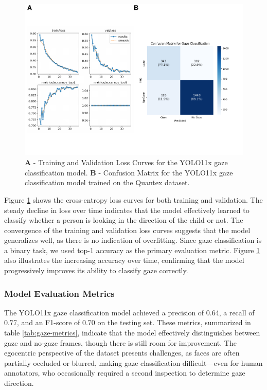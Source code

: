 \documentclass[
  man,floatsintext]{apa6}
\begin{document}
\begin{figure}

{\centering \includegraphics{Quantex_interaction_paper_files/figure-latex/gaze-loss-confusion-matrix-1} 

}

\caption{\textbf{A} - Training and Validation Loss Curves for the YOLO11x gaze classification model. \textbf{B} - Confusion Matrix for the YOLO11x gaze classification model trained on the Quantex dataset.}\label{fig:gaze-loss-confusion-matrix}
\end{figure}

Figure \ref{fig:gaze-loss-confusion-matrix} shows the cross-entropy loss curves for both training and validation. The steady decline in loss over time indicates that the model effectively learned to classify whether a person is looking in the direction of the child or not. The convergence of the training and validation loss curves suggests that the model generalizes well, as there is no indication of overfitting. Since gaze classification is a binary task, we used top-1 accuracy as the primary evaluation metric. Figure \ref{fig:gaze-loss-confusion-matrix} also illustrates the increasing accuracy over time, confirming that the model progressively improves its ability to classify gaze correctly.

\subsubsection{Model Evaluation Metrics}\label{model-evaluation-metrics-1}

The YOLO11x gaze classification model achieved a precision of 0.64, a recall of 0.77, and an F1-score of 0.70 on the testing set. These metrics, summarized in table \ref{tab:gaze-metrics}, indicate that the model effectively distinguishes between gaze and no-gaze frames, though there is still room for improvement. The egocentric perspective of the dataset presents challenges, as faces are often partially occluded or blurred, making gaze classification difficult---even for human annotators, who occasionally required a second inspection to determine gaze direction.
\end{document}
